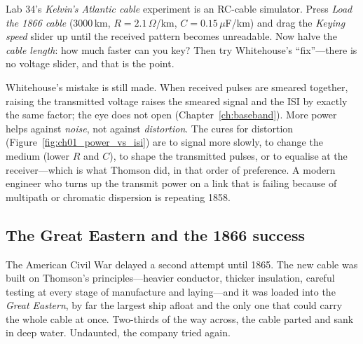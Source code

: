 
\begin{tryit}
Lab 34's \emph{Kelvin's Atlantic cable} experiment is an RC-cable simulator. Press \emph{Load the 1866
cable} (3000\,km, $R=2.1\,\Omega$/km, $C=0.15\,\mu$F/km) and drag the \emph{Keying speed} slider up until the
received pattern becomes unreadable. Now halve the \emph{cable length}: how much faster can you key?
Then try Whitehouse's ``fix''---there is no voltage slider, and that is the point.
\end{tryit}


\begin{pitfall}
Whitehouse's mistake is still made. When received pulses are smeared together, raising the
transmitted voltage raises the smeared signal and the ISI by exactly the same factor; the eye
does not open (Chapter~\ref{ch:baseband}). More power helps against \emph{noise}, not against
\emph{distortion}. The cures for distortion (Figure~\ref{fig:ch01_power_vs_isi}) are to signal more slowly, to change the medium (lower
$R$ and $C$), to shape the transmitted pulses, or to equalise at the receiver---which is what
Thomson did, in that order of preference. A modern engineer who turns up the transmit power on a
link that is failing because of multipath or chromatic dispersion is repeating 1858.
\end{pitfall}

\subsection{The Great Eastern and the 1866 success}

The American Civil War delayed a second attempt until 1865. The new cable was built on Thomson's
principles---heavier conductor, thicker insulation, careful testing at every stage of manufacture and
laying---and it was loaded into the \emph{Great Eastern}, by far the largest ship afloat and the only
one that could carry the whole cable at once. Two-thirds of the way across, the cable parted and sank
in deep water. Undaunted, the company tried again.



